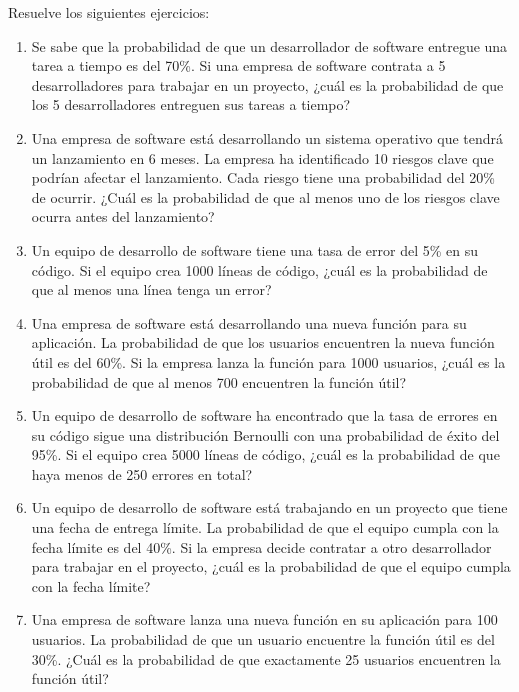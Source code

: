 \begin{Ejer}
Resuelve los siguientes ejercicios:
\begin{enumerate}

    \item Se sabe que la probabilidad de que un desarrollador de software entregue una tarea a tiempo es del 70\%. Si una empresa de software contrata a 5 desarrolladores para trabajar en un proyecto, ¿cuál es la probabilidad de que los 5 desarrolladores entreguen sus tareas a tiempo?

    \item Una empresa de software está desarrollando un sistema operativo que tendrá un lanzamiento en 6 meses. La empresa ha identificado 10 riesgos clave que podrían afectar el lanzamiento. Cada riesgo tiene una probabilidad del 20\% de ocurrir. ¿Cuál es la probabilidad de que al menos uno de los riesgos clave ocurra antes del lanzamiento?

    \item Un equipo de desarrollo de software tiene una tasa de error del 5\% en su código. Si el equipo crea 1000 líneas de código, ¿cuál es la probabilidad de que al menos una línea tenga un error?

    \item Una empresa de software está desarrollando una nueva función para su aplicación. La probabilidad de que los usuarios encuentren la nueva función útil es del 60\%. Si la empresa lanza la función para 1000 usuarios, ¿cuál es la probabilidad de que al menos 700 encuentren la función útil?

    \item Un equipo de desarrollo de software ha encontrado que la tasa de errores en su código sigue una distribución Bernoulli con una probabilidad de éxito del 95\%. Si el equipo crea 5000 líneas de código, ¿cuál es la probabilidad de que haya menos de 250 errores en total?

    \item Un equipo de desarrollo de software está trabajando en un proyecto que tiene una fecha de entrega límite. La probabilidad de que el equipo cumpla con la fecha límite es del 40\%. Si la empresa decide contratar a otro desarrollador para trabajar en el proyecto, ¿cuál es la probabilidad de que el equipo cumpla con la fecha límite?

    \item Una empresa de software lanza una nueva función en su aplicación para 100 usuarios. La probabilidad de que un usuario encuentre la función útil es del 30\%. ¿Cuál es la probabilidad de que exactamente 25 usuarios encuentren la función útil?


\end{enumerate}
\end{Ejer}
